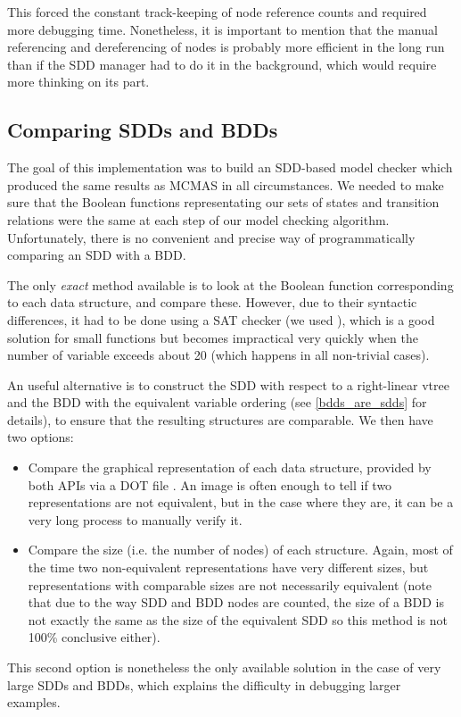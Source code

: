 \documentclass[11pt]{report}
\begin{document}
This forced the constant track-keeping of node reference counts and required more debugging time. Nonetheless, it is important to mention that the manual referencing and dereferencing of nodes is probably more efficient in the long run than if the SDD manager had to do it in the background, which would require more thinking on its part.

\subsection{Comparing SDDs and BDDs}

The goal of this implementation was to build an SDD-based model checker which produced the same results as MCMAS in all circumstances. We needed to make sure that the Boolean functions representating our sets of states and transition relations were the same at each step of our model checking algorithm. Unfortunately, there is no convenient and precise way of programmatically comparing an SDD with a BDD. 

The only \textit{exact} method available is to look at the Boolean function corresponding to each data structure, and compare these. However, due to their syntactic differences, it had to be done using a SAT checker (we used \cite{minisat}), which is a good solution for small functions but becomes impractical very quickly when the number of variable exceeds about 20 (which happens in all non-trivial cases).  

An useful alternative is to construct the SDD with respect to a right-linear vtree and the BDD with the equivalent variable ordering (see \ref{bdds_are_sdds} for details), to ensure that the resulting structures are comparable. We then have two options:
\begin{itemize}

\item Compare the graphical representation of each data structure, provided by both APIs via a DOT file \cite{dot}. An image is often enough to tell if two representations are not equivalent, but in the case where they are, it can be a very long process to manually verify it.
\item Compare the size (i.e. the number of nodes) of each structure. Again, most of the time two non-equivalent representations have very different sizes, but representations with comparable sizes are not necessarily equivalent (note that due to the way SDD and BDD nodes are counted, the size of a BDD is not exactly the same as the size of the equivalent SDD so this method is not 100\% conclusive either).

\end{itemize}
 This second option is nonetheless the only available solution in the case of very large SDDs and BDDs, which explains the difficulty in debugging larger examples.
\end{document}
